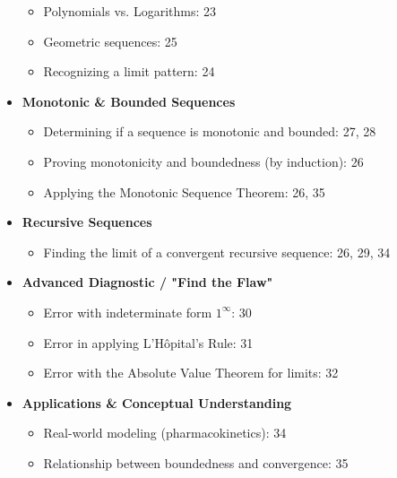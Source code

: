 \documentclass{article}
\begin{document}
\begin{itemize}
\begin{itemize}
            \item Polynomials vs. Logarithms: 23
            \item Geometric sequences: 25
            \item Recognizing a limit pattern: 24
        \end{itemize}
    \item \textbf{Monotonic \& Bounded Sequences}
        \begin{itemize}
            \item Determining if a sequence is monotonic and bounded: 27, 28
            \item Proving monotonicity and boundedness (by induction): 26
            \item Applying the Monotonic Sequence Theorem: 26, 35
        \end{itemize}
    \item \textbf{Recursive Sequences}
        \begin{itemize}
            \item Finding the limit of a convergent recursive sequence: 26, 29, 34
        \end{itemize}
    \item \textbf{Advanced Diagnostic / "Find the Flaw"}
        \begin{itemize}
            \item Error with indeterminate form $1^\infty$: 30
            \item Error in applying L'Hôpital's Rule: 31
            \item Error with the Absolute Value Theorem for limits: 32
        \end{itemize}
    \item \textbf{Applications \& Conceptual Understanding}
        \begin{itemize}
            \item Real-world modeling (pharmacokinetics): 34
            \item Relationship between boundedness and convergence: 35
        \end{itemize}
\end{itemize}
\end{document}
